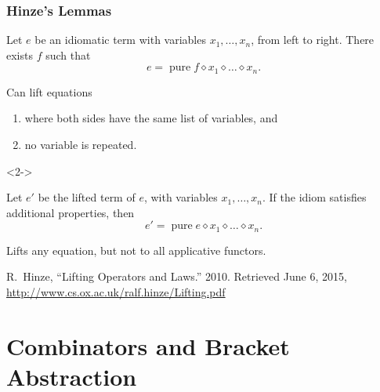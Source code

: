 \documentclass[smaller,leqno]{beamer}
\newenvironment{reference}{\begingroup\scriptsize\singlespacing\color{gray}}{\par\endgroup}
\DeclareMathOperator{\pure}{pure}
\newcommand{\ap}{\diamond}
\begin{document}
\begin{frame}
\frametitle{Hinze's Lemmas}

\begin{lemma}
Let $e$ be an idiomatic term with variables $x_1,\dots,x_n$, from left to right.
There exists $f$ such that
\[ e = \pure f \ap x_1 \ap \dots \ap x_n. \]
\end{lemma}

Can lift equations
\begin{enumerate}
\item where both sides have the same list of variables, and
\item no variable is repeated.
\end{enumerate}

\begin{uncoverenv}<2->
\vspace{5mm}
\begin{lemma}
Let $e'$ be the lifted term of $e$, with variables $x_1,\dots,x_n$.
If the idiom satisfies additional properties, then
\[ e' = \pure e \ap x_1 \ap \dots \ap x_n.  \]
\end{lemma}

Lifts any equation, but not to all applicative functors.
\end{uncoverenv}

\vspace{\fill}
\begin{reference}
R.\ Hinze, ``Lifting Operators and Laws.'' 2010. Retrieved June 6, 2015,
\url{http://www.cs.ox.ac.uk/ralf.hinze/Lifting.pdf}
\end{reference}
\end{frame}

\section{Combinators and Bracket Abstraction} %
\end{document}
